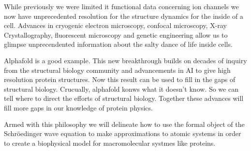 While previously we were limited it functional data concerning ion channels we now have unprecedented resolution for the structure dynamics for the inside of a cell. Advances in cryogenic electron microscopy, confocal microscopy, X-ray Crystallography, fluorescent microscopy and genetic engineering allow us to glimpse unprecendented information about the salty dance of life inside cells.

Alphafold is a good example. This new breakthrough builds on decades of inquiry from the structural biology community and advancements in AI to give high resolution protein structures. Now this result can be used to fill in the gaps of structural biology. Crucually, alphafold konws what it doesn't know. So we can tell where to direct the efforts of structural biology. Together these advances will fill more gaps in our knowledge of protein physics. 

Armed with this philosophy we will delineate how to use the formal object of the Schr\"oedinger wave equation to make approximations to atomic systems in order to create a biophysical model for macromolecular systmes like proteins.

